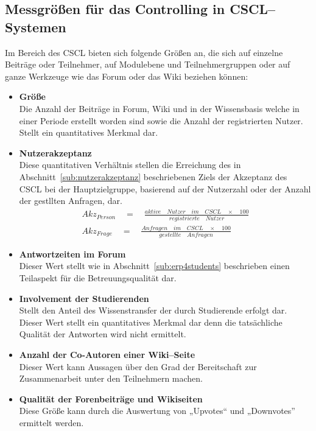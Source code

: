 \subsection{Messgrößen für das Controlling in CSCL–Systemen} %
\label{sub:messgrossen_fur_das_controlling_in_cscl_systemen}
Im Bereich des \ac{CSCL} bieten sich folgende Größen an, die sich auf einzelne Beiträge oder Teilnehmer, auf Modulebene und Teilnehmergruppen oder auf ganze Werkzeuge wie das Forum oder das Wiki beziehen können:

\begin{itemize}
	\item \textbf{Größe}\\ Die Anzahl der Beiträge in Forum, Wiki und in der Wissensbasis welche in einer Periode erstellt worden sind sowie die Anzahl der registrierten Nutzer. Stellt ein quantitatives Merkmal dar. 
	\item \textbf{Nutzerakzeptanz}\\ Diese 
	 quantitativen Verhältnis stellen die Erreichung des in Abschnitt~\ref{sub:nutzerakzeptanz} beschriebenen Ziels der Akzeptanz des \ac{CSCL} bei der Hauptzielgruppe, basierend auf der Nutzerzahl oder der Anzahl der gestllten Anfragen, dar.
\begin{align}
	 { Akz }_{ Person }\quad =\quad \frac { aktive\quad Nutzer\quad im\quad CSCL\quad \times \quad 100 }{ registrierte\quad Nutzer } \\
	 { Akz }_{ Frage }\quad =\quad \frac { Anfragen\quad im\quad CSCL\quad \times \quad 100 }{ gestellte\quad Anfragen } 
\end{align}
	\item \textbf{Antwortzeiten im Forum}\\ Dieser Wert stellt wie in Abschnitt~\ref{sub:erp4students} beschrieben einen Teilaspekt für die Betreuungsqualität dar.
	\item \textbf{Involvement der Studierenden}\\ Stellt den Anteil des Wissenstransfer der durch Studierende erfolgt dar. Dieser Wert stellt ein quantitatives Merkmal dar denn die tatsächliche Qualität der Antworten wird nicht ermittelt.
	\item \textbf{Anzahl der Co-Autoren einer Wiki–Seite}\\ Dieser Wert kann Aussagen über den Grad der Bereitschaft zur Zusammenarbeit unter den Teilnehmern machen.
	\item \textbf{Qualität der Forenbeiträge und Wikiseiten}\\ Diese Größe kann durch die Auswertung von „Upvotes“ und „Downvotes” ermittelt werden.

\end{itemize}
